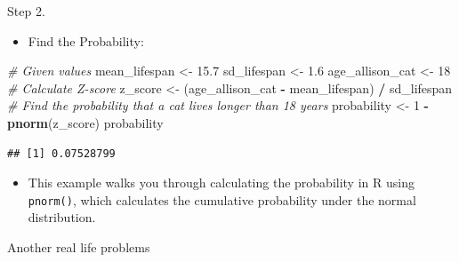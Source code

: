 \documentclass[
  ignorenonframetext,
]{beamer}
\newenvironment{Shaded}{\begin{snugshade}}{\end{snugshade}}
\newcommand{\CommentTok}[1]{\textcolor[rgb]{0.56,0.35,0.01}{\textit{#1}}}
\newcommand{\DecValTok}[1]{\textcolor[rgb]{0.00,0.00,0.81}{#1}}
\newcommand{\FloatTok}[1]{\textcolor[rgb]{0.00,0.00,0.81}{#1}}
\newcommand{\FunctionTok}[1]{\textcolor[rgb]{0.13,0.29,0.53}{\textbf{#1}}}
\newcommand{\NormalTok}[1]{#1}
\newcommand{\OtherTok}[1]{\textcolor[rgb]{0.56,0.35,0.01}{#1}}
\newcommand{\SpecialCharTok}[1]{\textcolor[rgb]{0.81,0.36,0.00}{\textbf{#1}}}
\providecommand{\tightlist}{%
  \setlength{\itemsep}{0pt}\setlength{\parskip}{0pt}}
\begin{document}
\begin{frame}[fragile]{Step 2.}
\label{step-2.-1}
\begin{itemize}
\tightlist
\item
  Find the Probability:
\end{itemize}

\begin{Shaded}
\begin{Highlighting}[]
\CommentTok{\# Given values}
\NormalTok{mean\_lifespan }\OtherTok{\textless{}{-}} \FloatTok{15.7}
\NormalTok{sd\_lifespan }\OtherTok{\textless{}{-}} \FloatTok{1.6}
\NormalTok{age\_allison\_cat }\OtherTok{\textless{}{-}} \DecValTok{18}
\CommentTok{\# Calculate Z{-}score}
\NormalTok{z\_score }\OtherTok{\textless{}{-}}\NormalTok{ (age\_allison\_cat }\SpecialCharTok{{-}}\NormalTok{ mean\_lifespan) }\SpecialCharTok{/}\NormalTok{ sd\_lifespan}
\CommentTok{\# Find the probability that a cat lives longer than 18 years}
\NormalTok{probability }\OtherTok{\textless{}{-}} \DecValTok{1} \SpecialCharTok{{-}} \FunctionTok{pnorm}\NormalTok{(z\_score)}
\NormalTok{probability}
\end{Highlighting}
\end{Shaded}

\begin{verbatim}
## [1] 0.07528799
\end{verbatim}

\begin{itemize}
\tightlist
\item
  This example walks you through calculating the probability in R using
  \texttt{pnorm()}, which calculates the cumulative probability under
  the normal distribution.
\end{itemize}
\end{frame}

\begin{frame}{Another real life problems}
\label{another-real-life-problems}
\end{frame}
\end{document}
